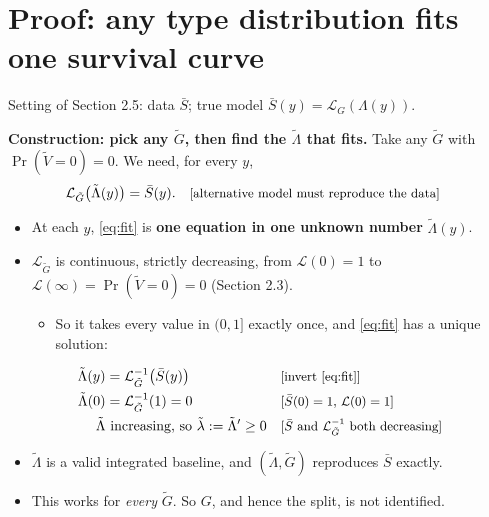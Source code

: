 \documentclass[11pt]{article}
\newcommand{\1}{\mathbf{1}}
\newcommand{\Lap}{\mathcal{L}}
\newcommand{\why}[1]{\text{\small[#1]}}
\begin{document}
\appendix
\section{Proof: any type distribution fits one survival curve}
Setting of Section 2.5: data $\bar S$; true model $\bar S(y)=\Lap_G(\Lambda(y))$.

\textbf{Construction: pick any $\tilde G$, then find the $\tilde\Lambda$ that fits.} Take any $\tilde G$ with $\Pr(\tilde V=0)=0$. We need, for every $y$,
\begin{align}
  \Lap_{\tilde G}\big(\tilde\Lambda(y)\big) &= \bar S(y). && \why{alternative model must reproduce the data} \label{eq:fit}
\end{align}
\begin{itemize}
  \item At each $y$, \eqref{eq:fit} is \textbf{one equation in one unknown number} $\tilde\Lambda(y)$.
  \item $\Lap_{\tilde G}$ is continuous, strictly decreasing, from $\Lap(0)=1$ to $\Lap(\infty)=\Pr(\tilde V=0)=0$ (Section 2.3).
    \begin{itemize}
      \item So it takes every value in $(0,1]$ exactly once, and \eqref{eq:fit} has a unique solution:
    \end{itemize}
\end{itemize}
\begin{align}
  \tilde\Lambda(y) &= \Lap_{\tilde G}^{-1}\big(\bar S(y)\big) && \why{invert \eqref{eq:fit}} \nonumber\\
  \tilde\Lambda(0) &= \Lap_{\tilde G}^{-1}(1)=0 && \why{$\bar S(0)=1$, $\Lap(0)=1$} \nonumber\\
  \tilde\Lambda &\text{ increasing, so } \tilde\lambda:=\tilde\Lambda'\ge0 && \why{$\bar S$ and $\Lap^{-1}_{\tilde G}$ both decreasing} \nonumber
\end{align}
\begin{itemize}
  \item $\tilde\Lambda$ is a valid integrated baseline, and $(\tilde\Lambda,\tilde G)$ reproduces $\bar S$ exactly.
  \item This works for \emph{every} $\tilde G$. So $G$, and hence the split, is not identified.
\end{itemize}
\end{document}
